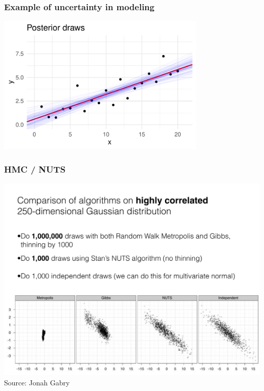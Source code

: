 \documentclass[10pt,handout]{beamer}
\begin{document}
\begin{frame}

\frametitle{ Example of uncertainty in modeling}

  \includegraphics[width=10cm]{figs/fakel_postdraws.pdf}

\end{frame}

\begin{frame}

\frametitle{ HMC / NUTS}

  \vspace{-.5\baselineskip}
  \includegraphics[width=\textwidth,clip]{figs/N250.pdf}\\
  Source: Jonah Gabry

\end{frame}
\end{document}
